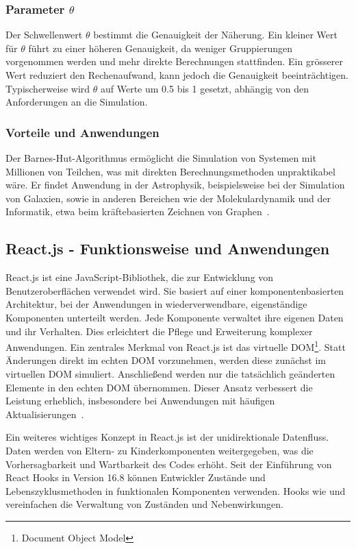 \documentclass[a4paper,12pt,twoside]{article}
\begin{document}
\subsubsection{Parameter $\theta$}
Der Schwellenwert $\theta$ bestimmt die Genauigkeit der Näherung. Ein kleiner Wert für $\theta$ führt zu einer höheren Genauigkeit, da weniger Gruppierungen vorgenommen werden und mehr direkte Berechnungen stattfinden. Ein grösserer Wert reduziert den Rechenaufwand, kann jedoch die Genauigkeit beeinträchtigen. Typischerweise wird $\theta$ auf Werte um 0.5 bis 1 gesetzt, abhängig von den Anforderungen an die Simulation.

\subsubsection{Vorteile und Anwendungen}
Der Barnes-Hut-Algorithmus ermöglicht die Simulation von Systemen mit Millionen von Teilchen, was mit direkten Berechnungsmethoden unpraktikabel wäre. Er findet Anwendung in der Astrophysik, beispielsweise bei der Simulation von Galaxien, sowie in anderen Bereichen wie der Molekulardynamik und der Informatik, etwa beim kräftebasierten Zeichnen von Graphen~\cite{Heer2017}.

\subsection{React.js - Funktionsweise und Anwendungen}

React.js ist eine JavaScript-Bibliothek, die zur Entwicklung 
von Benutzeroberflächen verwendet wird. 
Sie basiert auf einer komponentenbasierten Architektur, 
bei der Anwendungen in wiederverwendbare, eigenständige 
Komponenten unterteilt werden. 
Jede Komponente verwaltet ihre eigenen Daten und ihr Verhalten. 
Dies erleichtert die Pflege und Erweiterung komplexer Anwendungen. 
Ein zentrales Merkmal von React.js ist das virtuelle DOM\footnote{Document Object Model}. Statt Änderungen direkt im echten DOM vorzunehmen, werden diese zunächst im virtuellen DOM simuliert. Anschließend werden nur die tatsächlich geänderten Elemente in den echten DOM übernommen. Dieser Ansatz verbessert die Leistung erheblich, insbesondere bei Anwendungen mit häufigen Aktualisierungen~\cite{ReactJSTutorial}.

Ein weiteres wichtiges Konzept in React.js ist der unidirektionale Datenfluss. Daten werden von Eltern- zu Kinderkomponenten weitergegeben, was die Vorhersagbarkeit und Wartbarkeit des Codes erhöht. Seit der Einführung von React Hooks in Version 16.8 können Entwickler Zustände und Lebenszyklusmethoden in funktionalen Komponenten verwenden. Hooks wie  und  vereinfachen die Verwaltung von Zuständen und Nebenwirkungen.
\end{document}
